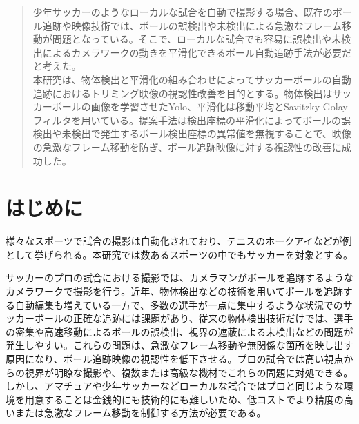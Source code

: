 \documentclass[11pt,a4j]{jreport}
\begin{document}
\begin{abstract}
    少年サッカーのようなローカルな試合を自動で撮影する場合、既存のボール追跡や映像技術では、ボールの誤検出や未検出による急激なフレーム移動が問題となっている。そこで、ローカルな試合でも容易に誤検出や未検出によるカメラワークの動きを平滑化できるボール自動追跡手法が必要だと考えた。\\
    本研究は、物体検出と平滑化の組み合わせによってサッカーボールの自動追跡におけるトリミング映像の視認性改善を目的とする。物体検出はサッカーボールの画像を学習させたYolo、平滑化は移動平均とSavitzky-Golayフィルタを用いている。提案手法は検出座標の平滑化によってボールの誤検出や未検出で発生するボール検出座標の異常値を無視することで、映像の急激なフレーム移動を防ぎ、ボール追跡映像に対する視認性の改善に成功した。
\end{abstract}


\tableofcontents

\pagestyle{fancy}
\lhead{\rightmark}
\renewcommand{\chaptermark}[1]{\markboth{第\ \normalfont\thechapter\ 章~~#1}{}}

\chapter{はじめに}
様々なスポーツで試合の撮影は自動化されており、テニスのホークアイ\cite{ホークアイ}などが例として挙げられる。本研究では数あるスポーツの中でもサッカーを対象とする。

サッカーのプロの試合における撮影では、カメラマンがボールを追跡するようなカメラワークで撮影を行う。近年、物体検出などの技術を用いてボールを追跡する自動編集も増えている\cite{auto1}一方で、多数の選手が一点に集中するような状況でのサッカーボールの正確な追跡には課題があり、従来の物体検出技術だけでは、選手の密集や高速移動によるボールの誤検出、視界の遮蔽による未検出などの問題が発生しやすい。\cite{切り替えシステム}\cite{高解像度}これらの問題は、急激なフレーム移動や無関係な箇所を映し出す原因になり、ボール追跡映像の視認性を低下させる。プロの試合では高い視点からの視界が明瞭な撮影や、複数または高級な機材でこれらの問題に対処できる。しかし、アマチュアや少年サッカーなどローカルな試合ではプロと同じような環境を用意することは金銭的にも技術的にも難しいため、低コストでより精度の高いまたは急激なフレーム移動を制御する方法が必要である。
\end{document}
